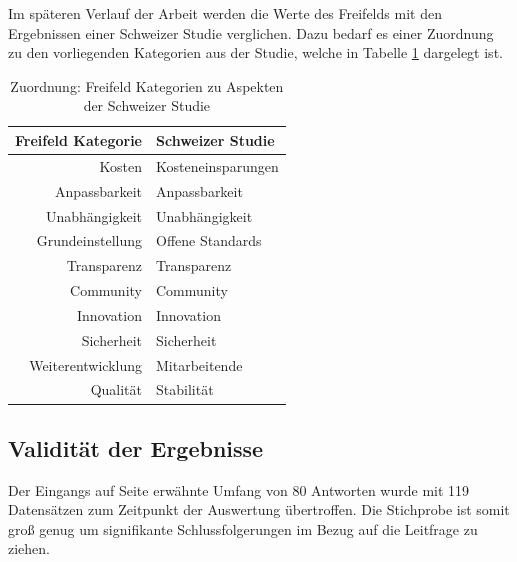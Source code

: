 \documentclass[a4paper]{article}
\begin{document}
            Im späteren Verlauf der Arbeit werden die Werte des Freifelds mit den Ergebnissen einer Schweizer Studie verglichen. Dazu bedarf es einer Zuordnung zu den vorliegenden Kategorien aus der Studie, welche in Tabelle \ref{table:privateToCommercialCategories} dargelegt ist.\\
            
            \begin{table}
                \centering
                \bgroup
                \def\arraystretch{1.5}
                \begin{tabular}{ r | l }
                    Freifeld Kategorie & Schweizer Studie\\ \hline
                    Kosten & Kosteneinsparungen\\
                    Anpassbarkeit & Anpassbarkeit\\
                    Unabhängigkeit & Unabhängigkeit\\
                    Grundeinstellung & Offene Standards\\
                    Transparenz & Transparenz\\
                    Community & Community\\
                    Innovation & Innovation\\
                    Sicherheit & Sicherheit\\
                    Weiterentwicklung & Mitarbeitende\\
                    Qualität & Stabilität
                \end{tabular}
                \egroup
                \caption{Zuordnung: Freifeld Kategorien zu Aspekten der Schweizer Studie}
                \label{table:privateToCommercialCategories}
            \end{table}
            
        \subsection{Validität der Ergebnisse}
            Der Eingangs auf Seite \pageref{section:fragestellung:answerAmount} erwähnte Umfang von 80 Antworten wurde mit 119 Datensätzen zum Zeitpunkt der Auswertung übertroffen. Die Stichprobe ist somit groß genug um signifikante Schlussfolgerungen im Bezug auf die Leitfrage zu ziehen. %
\end{document}
